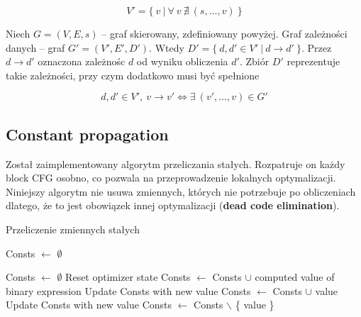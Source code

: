 \documentclass[leqno, 12pt]{article}
\newcommand{\spacing}{\vskip 0.5cm}
\begin{document}
			$$V' = \{ \ v \ | \ \forall \ v \ \nexists \ (s, ..., v) \ \}$$

			\spacing

			Niech $G = (V, E, s)$ -- graf skierowany, zdefiniowany powyżej. Graf zależności danych -- graf
			$G' = (V', E', D')$. Wtedy $D' = \{ \ d, d' \in V' \ | \ d \rightarrow d' \ \}$. Przez $d \rightarrow d'$
			oznaczona zależnośc $d$ od wyniku obliczenia $d'$. Zbiór $D'$ reprezentuje takie zależności, przy czym
			dodatkowo musi być spełnione

			$$d, d' \in V', \ v \rightarrow v' \iff \exists \ (v', ..., v) \in G' $$
	
		\subsection{Constant propagation}
		
			Został zaimplementowany algorytm przeliczania stałych. Rozpatruje on każdy block CFG osobno,
			co pozwala na przeprowadzenie lokalnych optymalizacji. Niniejszy algorytm nie usuwa zmiennych,
			których nie potrzebuje po obliczeniach dlatego, że to jest obowiązek innej optymalizacji
			(\textbf{dead code elimination}). 

			\spacing
		
			\begin{algorithm}
				\caption{Przeliczenie zmiennych stałych}
				\begin{algorithmic}[1]

					\State Consts $\gets$ $\emptyset$
					
							\State Consts $\gets$ $\emptyset$
							\Comment Reset optimizer state
						\EndIf
							\State Consts $\gets$ Consts $\cup$ computed value of binary expression
						\EndIf
									\State Update Consts with new value
								\Else
									\State Consts $\gets$ Consts $\cup$ value
								\EndIf
							\EndIf
									\State Update Consts with new value
								\Else
									\State Consts $\gets$ Consts $\backslash$ \{ value \}
								\EndIf
							\EndIf
						\EndIf
					\EndFor
				\EndProcedure

				\end{algorithmic}
			\end{algorithm}
		
\end{document}
